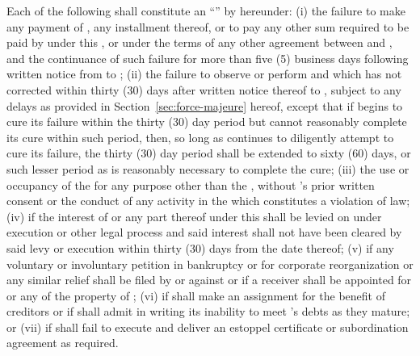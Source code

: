 Each of the following shall constitute an ``'' by \lessee hereunder: (i) the failure to make any payment of \monthlyRent, any installment thereof, or to pay any other sum required to be paid by \lessee under this \lease, or under the terms of any other agreement between \lessor and \lessee, and the continuance of such failure for more than five (5) business days following written notice from \lessor to \lessee; (ii) the failure to observe or perform and which \lessee has not corrected within thirty (30) days after written notice thereof to \lessee, subject to any delays as provided in Section~\ref{sec:force-majeure} hereof, except that if \lessee begins to cure its failure within the thirty (30) day period but cannot reasonably complete its cure within such period, then, so long as \lessee continues to diligently attempt to cure its failure, the thirty (30) day period shall be extended to sixty (60) days, or such lesser period as is reasonably necessary to complete the cure; (iii) the use or occupancy of the \premises for any purpose other than the \permittedUse, without \lessor's prior written consent or the conduct of any activity in the \premises which constitutes a violation of law; (iv) if the interest of \lessee or any part thereof under this \lease shall be levied on under execution or other legal process and said interest shall not have been cleared by said levy or execution within thirty (30) days from the date thereof; (v) if any voluntary or involuntary petition in bankruptcy or for corporate reorganization or any similar relief shall be filed by or against \lessee or if a receiver shall be appointed for \lessee or any of the property of \lessee; (vi) if \lessee shall make an assignment for the benefit of creditors or if \lessee shall admit in writing its inability to meet \lessee's debts as they mature; or (vii) if \lessee shall fail to execute and deliver an estoppel certificate or subordination agreement as required.
